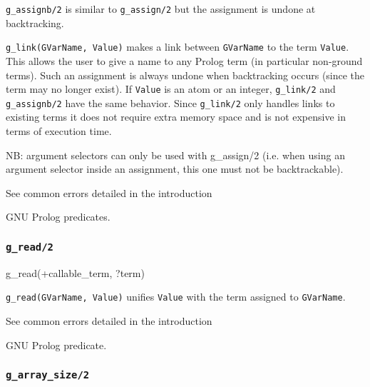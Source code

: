 \texttt{g\_assignb/2} is similar to \texttt{g\_assign/2} but the assignment
is undone at backtracking.

\texttt{g\_link(GVarName, Value)} makes a link between \texttt{GVarName} to
the term \texttt{Value}. This allows the user to give a name to any Prolog
term (in particular non-ground terms). Such an assignment is always undone
when backtracking occurs (since the term may no longer exist). If
\texttt{Value} is an atom or an integer, \texttt{g\_link/2} and
\texttt{g\_assignb/2} have the same behavior. Since \texttt{g\_link/2} only
handles links to existing terms it does not require extra memory space and
is not expensive in terms of execution time.

NB: argument selectors can only be used with {g\_assign/2} (i.e. when using
an argument selector inside an assignment, this one must not be
backtrackable).

\Errors

See common errors detailed in the introduction 

\begin{PlErrorsNoTitle}


\end{PlErrorsNoTitle}

\Portability

GNU Prolog predicates.

\subsubsection{\texttt{g\_read/2}}

\begin{TemplatesOneCol}
g\_read(+callable\_term, ?term)

\end{TemplatesOneCol}

\Description

\texttt{g\_read(GVarName, Value)} unifies \texttt{Value} with the term
assigned to \texttt{GVarName}.

\Errors

See common errors detailed in the introduction 

\Portability

GNU Prolog predicate.

\subsubsection{\texttt{g\_array\_size/2}}

